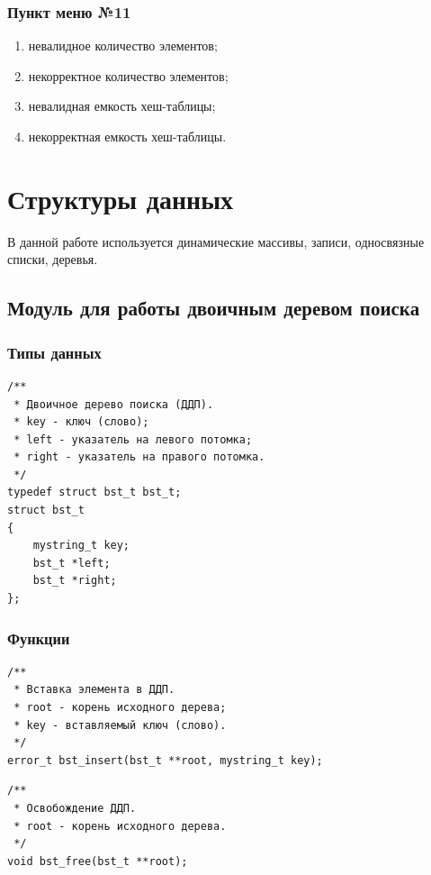 \documentclass[a4paper,12pt]{extarticle}
\begin{document}
\subsubsection{Пункт меню №11}
\begin{enumerate}
    \item невалидное количество элементов;
    \item некорректное количество элементов;
    \item невалидная емкость хеш-таблицы;
    \item некорректная емкость хеш-таблицы.
\end{enumerate}

\newpage

\section{Структуры данных}
В данной работе используется динамические массивы, записи, односвязные списки, деревья.

\subsection{Модуль для работы двоичным деревом поиска}
\subsubsection{Типы данных}

\begin{verbatim}
/**
 * Двоичное дерево поиска (ДДП).
 * key - ключ (слово);
 * left - указатель на левого потомка;
 * right - указатель на правого потомка.
 */
typedef struct bst_t bst_t;
struct bst_t
{
    mystring_t key;
    bst_t *left;
    bst_t *right;
};
\end{verbatim}

\subsubsection{Функции}

\begin{verbatim}
/**
 * Вставка элемента в ДДП.
 * root - корень исходного дерева;
 * key - вставляемый ключ (слово).
 */
error_t bst_insert(bst_t **root, mystring_t key);
\end{verbatim}


\begin{verbatim}
/**
 * Освобождение ДДП.
 * root - корень исходного дерева.
 */
void bst_free(bst_t **root);
\end{verbatim}
\end{document}
